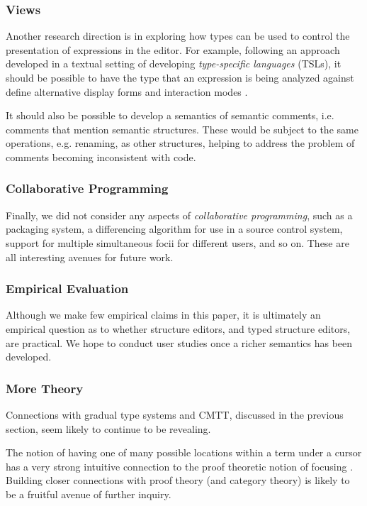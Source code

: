 \documentclass[preprint,9pt]{sigplanconf}
\begin{document}
\subsubsection{Views}
Another research direction is in exploring how types can be used to control
the presentation of expressions in the editor. For example, following an
approach developed in a textual setting of developing \emph{type-specific
languages} (TSLs), it should be possible to have the type that an
expression is being analyzed against define alternative display forms and
interaction modes \cite{TSLs}.

It should also be possible to develop a semantics of semantic comments,
i.e. comments that mention semantic structures. These would be subject to
the same operations, e.g. renaming, as other structures, helping to address
the problem of comments becoming inconsistent with code.

\subsubsection{Collaborative Programming}
Finally, we did not consider any aspects of \emph{collaborative
programming}, such as a packaging system, a differencing algorithm for use
in a source control system, support for multiple simultaneous focii for
different users, and so on. These are all interesting avenues for future
work.

\subsubsection{Empirical Evaluation}
Although we make few empirical claims in this paper, it is ultimately an
empirical question as to whether structure editors, and typed structure
editors, are practical. We hope to conduct user studies once a richer
semantics has been developed.

\subsubsection{More Theory}
Connections with gradual type systems and CMTT, discussed in the previous
section, seem likely to continue to be revealing.

The notion of having one of many possible locations within a term under a
cursor has a very strong intuitive connection to the proof theoretic notion
of focusing \cite{Simmons11tr}. Building closer connections with proof
theory (and category theory) is likely to be a fruitful avenue of further
inquiry.
\end{document}
